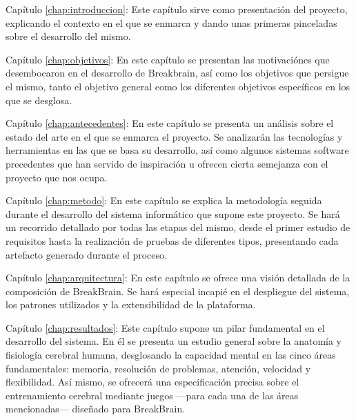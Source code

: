 \begin{definitionlist}

\item [Capítulo \ref{chap:introduccion}: \nameref{chap:introduccion}] Este capítulo sirve como presentación del proyecto, explicando el contexto en el que se enmarca y dando unas primeras pinceladas sobre el desarrollo del mismo.

\item [Capítulo \ref{chap:objetivos}: \nameref{chap:objetivos}] En este capítulo se presentan las motivaciónes que desembocaron en el desarrollo de Breakbrain, así como los objetivos que persigue el mismo, tanto el objetivo general como los diferentes objetivos específicos en los que se desglosa.

\item [Capítulo \ref{chap:antecedentes}: \nameref{chap:antecedentes}] En este capítulo se presenta un análisis sobre el estado del arte en el que se enmarca el proyecto. Se analizarán las tecnologías y herramientas en las que se basa su desarrollo, así como algunos sistemas software precedentes que han servido de inspiración u ofrecen cierta semejanza con el proyecto que nos ocupa.

\item [Capítulo \ref{chap:metodo}: \nameref{chap:metodo}] En este capítulo se explica la metodología seguida durante el desarrollo del sistema informático que supone este proyecto. Se hará un recorrido detallado por todas las etapas del mismo, desde el primer estudio de requisitos hasta la realización de pruebas de diferentes tipos, presentando cada artefacto generado durante el proceso.

\item [Capítulo \ref{chap:arquitectura}: \nameref{chap:arquitectura}] En este capítulo se ofrece una visión detallada de la composición de BreakBrain. Se hará especial incapié en el despliegue del sistema, los patrones utilizados y la extensibilidad de la plataforma.

\item [Capítulo \ref{chap:resultados}: \nameref{chap:resultados}] Este capítulo supone un pilar fundamental en el desarrollo del sistema. En él se presenta un estudio general sobre la anatomía y fisiología cerebral humana, desglosando la capacidad mental en las cinco áreas fundamentales: memoria, resolución de problemas, atención, velocidad y flexibilidad. Así mismo, se ofrecerá una especificación precisa sobre el entrenamiento cerebral mediante juegos ---para cada una de las áreas mencionadas--- diseñado para BreakBrain.


\end{definitionlist}
